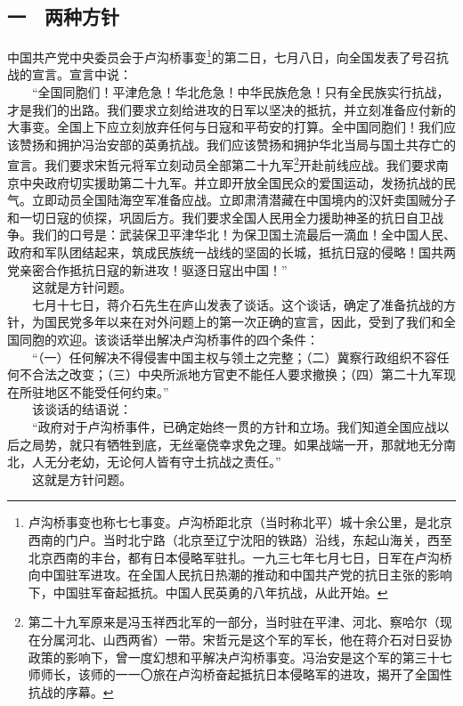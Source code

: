 \documentclass[cn,11pt,chinese]{elegantbook}
\def\myformat#1{\hfil\hfil #1}
\begin{document}
\subsection*{\myformat{一　两种方针}}
中国共产党中央委员会于卢沟桥事变\footnote[1]{ 卢沟桥事变也称七七事变。卢沟桥距北京（当时称北平）城十余公里，是北京西南的门户。当时北宁路（北京至辽宁沈阳的铁路）沿线，东起山海关，西至北京西南的丰台，都有日本侵略军驻扎。一九三七年七月七日，日军在卢沟桥向中国驻军进攻。在全国人民抗日热潮的推动和中国共产党的抗日主张的影响下，中国驻军奋起抵抗。中国人民英勇的八年抗战，从此开始。}的第二日，七月八日，向全国发表了号召抗战的宣言。宣言中说：\\
　　“全国同胞们！平津危急！华北危急！中华民族危急！只有全民族实行抗战，才是我们的出路。我们要求立刻给进攻的日军以坚决的抵抗，并立刻准备应付新的大事变。全国上下应立刻放弃任何与日寇和平苟安的打算。全中国同胞们！我们应该赞扬和拥护冯治安部的英勇抗战。我们应该赞扬和拥护华北当局与国土共存亡的宣言。我们要求宋哲元将军立刻动员全部第二十九军\footnote[2]{ 第二十九军原来是冯玉祥西北军的一部分，当时驻在平津、河北、察哈尔（现在分属河北、山西两省）一带。宋哲元是这个军的军长，他在蒋介石对日妥协政策的影响下，曾一度幻想和平解决卢沟桥事变。冯治安是这个军的第三十七师师长，该师的一一〇旅在卢沟桥奋起抵抗日本侵略军的进攻，揭开了全国性抗战的序幕。}开赴前线应战。我们要求南京中央政府切实援助第二十九军。并立即开放全国民众的爱国运动，发扬抗战的民气。立即动员全国陆海空军准备应战。立即肃清潜藏在中国境内的汉奸卖国贼分子和一切日寇的侦探，巩固后方。我们要求全国人民用全力援助神圣的抗日自卫战争。我们的口号是：武装保卫平津华北！为保卫国土流最后一滴血！全中国人民、政府和军队团结起来，筑成民族统一战线的坚固的长城，抵抗日寇的侵略！国共两党亲密合作抵抗日寇的新进攻！驱逐日寇出中国！”\\
　　这就是方针问题。\\
　　七月十七日，蒋介石先生在庐山发表了谈话。这个谈话，确定了准备抗战的方针，为国民党多年以来在对外问题上的第一次正确的宣言，因此，受到了我们和全国同胞的欢迎。该谈话举出解决卢沟桥事件的四个条件：\\
　　“（一）任何解决不得侵害中国主权与领土之完整；（二）冀察行政组织不容任何不合法之改变；（三）中央所派地方官吏不能任人要求撤换；（四）第二十九军现在所驻地区不能受任何约束。”\\
　　该谈话的结语说：\\
　　“政府对于卢沟桥事件，已确定始终一贯的方针和立场。我们知道全国应战以后之局势，就只有牺牲到底，无丝毫侥幸求免之理。如果战端一开，那就地无分南北，人无分老幼，无论何人皆有守土抗战之责任。”\\
　　这就是方针问题。\\
\end{document}
